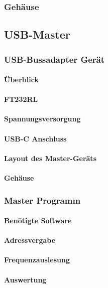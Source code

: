 \subsubsection{Gehäuse}


\subsection{USB-Master}
\subsubsection{USB-Bussadapter Gerät}
\paragraph{Überblick}
\paragraph{FT232RL}
\paragraph{Spannungsversorgung}
\paragraph{USB-C Anschluss}
\paragraph{Layout des Master-Geräts}
\paragraph{Gehäuse}

\subsubsection{Master Programm}
\paragraph{Benötigte Software}
\paragraph{Adressvergabe}
\paragraph{Frequenzauslesung}

\paragraph{Auswertung}
